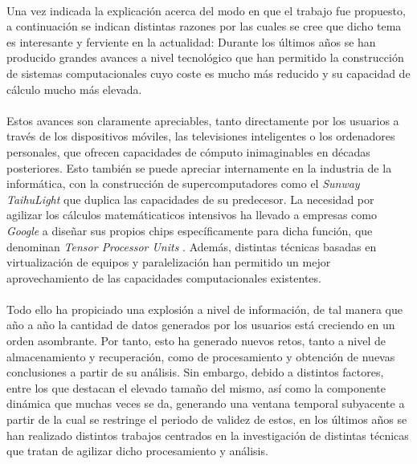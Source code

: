 \documentclass{subfiles}
\begin{document}
      \paragraph{}
      Una vez indicada la explicación acerca del modo en que el trabajo fue propuesto, a continuación se indican distintas razones por las cuales se cree que dicho tema es interesante y ferviente en la actualidad: Durante los últimos años se han producido grandes avances a nivel tecnológico que han permitido la construcción de sistemas computacionales cuyo coste es mucho más reducido y su capacidad de cálculo mucho más elevada.

      \paragraph{}
      Estos avances son claramente apreciables, tanto directamente por los usuarios a través de los dispositivos móviles, las televisiones inteligentes o los ordenadores personales, que ofrecen capacidades de cómputo inimaginables en décadas posteriores. Esto también se puede apreciar internamente en la industria de la informática, con la construcción de supercomputadores como el \emph{Sunway TaihuLight} que duplica las capacidades de su predecesor. La necesidad por agilizar los cálculos matemáticaticos intensivos ha llevado a empresas como \emph{Google} a diseñar sus propios chips específicamente para dicha función, que denominan \emph{Tensor Processor Units} \cite{jouppi2017datacenter}. Además, distintas técnicas basadas en virtualización de equipos y paralelización han permitido un mejor aprovechamiento de las capacidades computacionales existentes.

      \paragraph{}
      Todo ello ha propiciado una explosión a nivel de información, de tal manera que año a año la cantidad de datos generados por los usuarios está creciendo en un orden asombrante. Por tanto, esto ha generado nuevos retos, tanto a nivel de almacenamiento y recuperación, como de procesamiento y obtención de nuevas conclusiones a partir de su análisis. Sin embargo, debido a distintos factores, entre los que destacan el elevado tamaño del mismo, así como la componente dinámica que muchas veces se da, generando una ventana temporal subyacente a partir de la cual se restringe el periodo de validez de estos, en los últimos años se han realizado distintos trabajos centrados en la investigación de distintas técnicas que tratan de agilizar dicho procesamiento y análisis.
\end{document}

